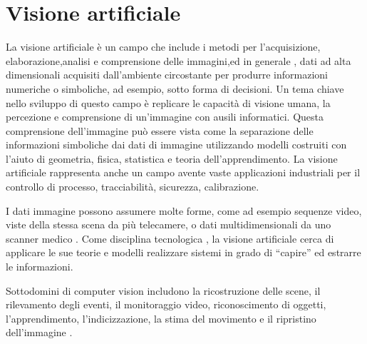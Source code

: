 \chapter{Visione artificiale}

La visione artificiale è un campo che include i metodi per l'acquisizione, elaborazione,analisi e comprensione delle immagini,ed in generale , dati ad alta dimensionali acquisiti dall'ambiente circostante per produrre informazioni numeriche o simboliche, ad esempio, sotto forma di decisioni. Un tema chiave nello sviluppo di questo campo è replicare le capacità di visione umana, la percezione e comprensione di un'immagine con ausili informatici. Questa comprensione dell'immagine può essere vista come la separazione delle informazioni simboliche dai dati di immagine utilizzando modelli costruiti con l'aiuto di geometria, fisica, statistica e teoria dell'apprendimento. La visione artificiale rappresenta anche un campo avente vaste applicazioni industriali per il controllo di processo, tracciabilità, sicurezza, calibrazione.

I dati immagine possono assumere molte forme, come ad esempio sequenze video, viste della stessa scena da più telecamere, o dati multidimensionali da uno scanner medico . Come disciplina tecnologica , la visione artificiale cerca di applicare le sue teorie e modelli realizzare sistemi in grado di ``capire'' ed estrarre le informazioni.

Sottodomini di computer vision includono la ricostruzione delle scene, il rilevamento degli eventi, il monitoraggio video, riconoscimento di oggetti, l'apprendimento, l'indicizzazione, la stima del movimento  e il ripristino dell'immagine .


\endinput